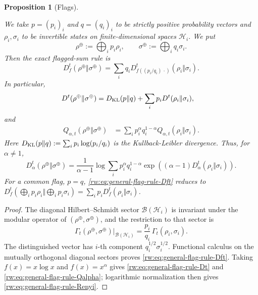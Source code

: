\documentclass[11pt]{article}
\newtheorem{proposition}[proposition]{Proposition}
\theoremstyle{remark}
\newcommand{\1}{\mathbbm{1}}
\begin{document}
\begin{proposition}[Flags]
\label{rw:prop:elementary-structural-rules-2}

 We take $p=(p_i)_i$ and $q=(q_i)_i$ to be strictly positive probability
vectors and $\rho_i,\sigma_i$ to be invertible states on finite-dimensional
spaces $\mathcal H_i$.  We put
\begin{equation}
 \rho^\oplus:=\bigoplus_i p_i\rho_i,
 \qquad
 \sigma^\oplus:=\bigoplus_i q_i\sigma_i.
\end{equation}
Then the exact flagged-sum rule is
\begin{equation}
 D_f^t(\rho^\oplus\Vert\sigma^\oplus)
 =\sum_iq_i
 D_{f((p_i/q_i)\,\cdot)}^t(\rho_i\Vert\sigma_i).
 \label{rw:eq:general-flag-rule-Dft}
\end{equation}
In particular,
\begin{align}
 D^t(\rho^\oplus\Vert\sigma^\oplus)
 &=D_{\rm KL}(p\Vert q)
   +\sum_i p_iD^t(\rho_i\Vert\sigma_i),
 \label{rw:eq:general-flag-rule-Dt}
\end{align}
and
\begin{align}
 Q_{\alpha,t}(\rho^\oplus\Vert\sigma^\oplus)
 &=\sum_i p_i^\alpha q_i^{1-\alpha}
   Q_{\alpha,t}(\rho_i\Vert\sigma_i).
 \label{rw:eq:general-flag-rule-Qalpha}
\end{align}
Here $D_{\rm KL}(p\Vert q):=\sum_i p_i\log(p_i/q_i)$ is the Kullback-Leibler divergence.
Thus, for $\alpha\ne1$,
\begin{equation}
 D_\alpha^t(\rho^\oplus\Vert\sigma^\oplus)
 =\frac1{\alpha-1}\log\sum_i
 p_i^\alpha q_i^{1-\alpha}
 \exp\!\left((\alpha-1)
 D_\alpha^t(\rho_i\Vert\sigma_i)\right).
 \label{rw:eq:general-flag-rule-Renyi}
\end{equation}
For a common flag, $p=q$,
\eqref{rw:eq:general-flag-rule-Dft} reduces to
$D_f^t(\bigoplus_i p_i\rho_i\Vert\bigoplus_i p_i\sigma_i)
=\sum_i p_iD_f^t(\rho_i\Vert\sigma_i)$.



\end{proposition}

\begin{proof}
The diagonal Hilbert--Schmidt sector
$\mathcal B(\mathcal H_i)$ is invariant under the modular operator
of $(\rho^\oplus,\sigma^\oplus)$, and the restriction to that sector
is
\begin{equation}
 \Gamma_t(\rho^\oplus,\sigma^\oplus)
 \big|_{\mathcal B(\mathcal H_i)}
 =\frac{p_i}{q_i}\,\Gamma_t(\rho_i,\sigma_i).
 \label{rw:eq:Gamma-flag-restriction}
\end{equation}
The distinguished vector has $i$-th component
$q_i^{1/2}\sigma_i^{1/2}$.  Functional calculus on the mutually
orthogonal diagonal sectors proves
\eqref{rw:eq:general-flag-rule-Dft}.  Taking
$f(x)=x\log x$ and $f(x)=x^\alpha$ gives
\eqref{rw:eq:general-flag-rule-Dt} and
\eqref{rw:eq:general-flag-rule-Qalpha}; logarithmic normalization
then gives \eqref{rw:eq:general-flag-rule-Renyi}.

\end{proof}
\end{document}
